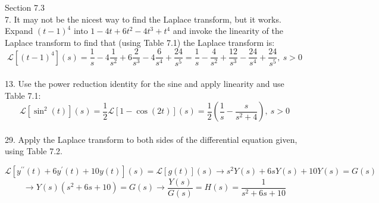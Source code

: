 \documentclass[11pt]{article}
\newcommand{\br}[1]{\left(#1\right)}
\newcommand{\dprime}{\prime\prime}
\newcommand{\lap}[2]{\mathcal{L}[#1](#2)}
\begin{document}
Section 7.3\\

7. It may not be the nicest way to find the Laplace transform, but it works. Expand $(t-1)^4$ into $1 - 4 t + 6 t^2 - 4 t^3 + t^4$ and invoke the linearity of the Laplace transform to find that (using Table 7.1) the Laplace transform is:
$$\lap{(t-1)^4}{s} = \frac{1}{s} -4 \frac{1}{s^2} + 6\frac{2}{s^3} -4 \frac{6}{s^4} + \frac{24}{s^5} = \frac{1}{s} - \frac{4}{s^2} + \frac{12}{s^3} - \frac{24}{s^4} + \frac{24}{s^5}, ~ s>0$$ \\

13. Use the power reduction identity for the sine and apply linearity and use Table 7.1:
$$\lap{\sin^2(t)}{s} = \frac{1}{2}\lap{1-\cos(2t)}{s} = \frac{1}{2}\br{\frac{1}{s}-\frac{s}{s^2+4}},~ s>0$$ \\

29. Apply the Laplace transform to both sides of the differential equation given, using Table 7.2.

$$\lap{y^{\dprime}(t) + 6y^{\prime}(t) + 10y(t)}{s} = \lap{g(t)}{s} \to s^2Y(s) + 6sY(s) + 10Y(s) = G(s)$$
$$\to Y(s)\br{s^2+6s+10} = G(s) \to \frac{Y(s)}{G(s)} = H(s) = \frac{1}{s^2+6s+10}$$
\end{document}
